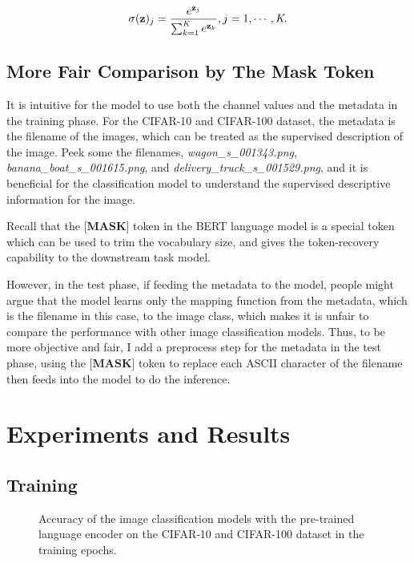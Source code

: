 \documentclass[review]{cvpr}
\begin{document}
\begin{equation}
  \sigma(\textbf{z})_j = {e^{\textbf{z}_j} \over {\sum_{k=1}^{\textit{K}} e^{\textbf{z}_k}}}, j=1,\cdots,\textit{K}.
\end{equation}

\subsection{More Fair Comparison by The Mask Token}

\par It is intuitive for the model to use both the channel values and the metadata in the training phase.
For the CIFAR-10 and CIFAR-100 dataset, the metadata is the filename of the images, which can be treated as the supervised description of the image.
Peek some the filenames, \eg \textit{wagon\_s\_001343.png}, \textit{banana\_boat\_s\_001615.png}, and \textit{delivery\_truck\_s\_001529.png},
and it is beneficial for the classification model to understand the supervised descriptive information for the image.

\par Recall that the $\textbf{[MASK]}$ token in the BERT language model is a special token which can be used to trim the vocabulary size,
and gives the token-recovery capability to the downstream task model.

\par However, in the test phase, if feeding the metadata to the model, people might argue that the model learns only the mapping function from
the metadata, which is the filename in this case, to the image class, which makes it is unfair to compare the performance with other image classification models.
Thus, to be more objective and fair, I add a preprocess step for the metadata in the test phase, using the $\textbf{[MASK]}$ token to replace each
ASCII character of the filename then feeds into the model to do the inference.



\section{Experiments and Results}


\subsection{Training}

\begin{figure*}
\begin{center}
\end{center}
   \caption{Accuracy of the image classification models with the pre-trained language encoder on the CIFAR-10 and CIFAR-100 dataset in the training epochs.}
\label{fig:short}
\end{figure*}
\end{document}
